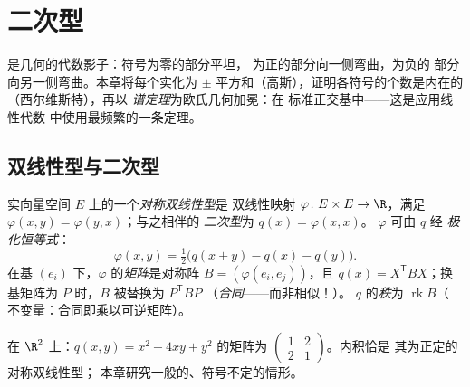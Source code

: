 \chapter{二次型}\label{ch:b2:quadratic}

是几何的代数影子：符号为零的部分平坦，
为正的部分向一侧弯曲，为负的
部分向另一侧弯曲。本章将每个实化为
$\pm$ 平方和（高斯），证明各符号的个数是内在的
（西尔维斯特），再以
\emph{谱定理}为欧氏几何加冕：在
标准正交基中——这是应用线性代数
中使用最频繁的一条定理。

\section{双线性型与二次型}

\begin{definition}\label{def:b2:quadratic:def}
实向量空间 $E$ 上的一个\emph{对称双线性型}是
双线性映射 $\varphi \colon E \times E \to \R$，满足 $\varphi(x, y) =
\varphi(y, x)$；与之相伴的
\emph{二次型}为 $q(x) = \varphi(x, x)$。
$\varphi$ 可由 $q$ 经
\emph{极化恒等式}：
\[
\varphi(x, y) = \tfrac12\bigl(q(x + y) - q(x) - q(y)\bigr).
\]
在基 $(e_i)$ 下，$\varphi$ 的\emph{矩阵}是对称阵
$B = (\varphi(e_i, e_j))$，且 $q(x) = X^{\mathsf T} B X$；换基矩阵为
$P$ 时，$B$ 被替换为 $P^{\mathsf T} B P$
（\emph{合同}——而非相似！）。
$q$ 的\emph{秩}为 $\operatorname{rk} B$（
不变量：合同即乘以可逆矩阵）。
\end{definition}

\begin{example}
在 $\R^2$ 上：$q(x, y) = x^2 + 4xy + y^2$ 的矩阵为 $\begin{pmatrix}
1 & 2\\ 2 & 1\end{pmatrix}$。内积恰是
其为正定的对称双线性型；
本章研究一般的、符号不定的情形。
\end{example}

